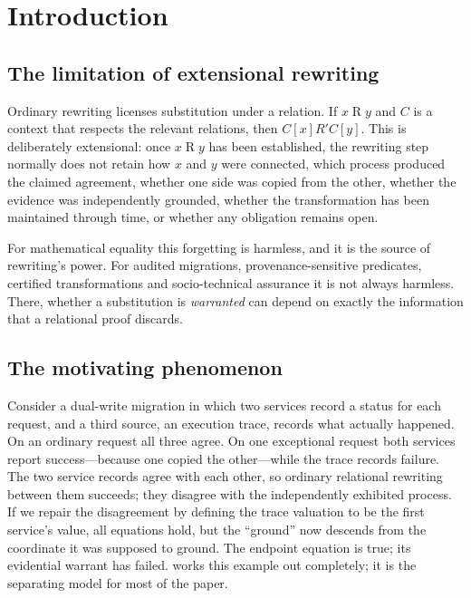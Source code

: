 \section{Introduction}\label{sec:intro}

\subsection{The limitation of extensional rewriting}
Ordinary rewriting licenses substitution under a relation. If $x \mathrel{R} y$ and $C$ is a context that respects the relevant relations, then $C[x] \mathrel{R'} C[y]$. This is deliberately extensional: once $x \mathrel{R} y$ has been established, the rewriting step normally does not retain how $x$ and $y$ were connected, which process produced the claimed agreement, whether one side was copied from the other, whether the evidence was independently grounded, whether the transformation has been maintained through time, or whether any obligation remains open.

For mathematical equality this forgetting is harmless, and it is the source of rewriting's power. For audited migrations, provenance-sensitive predicates, certified transformations and socio-technical assurance it is not always harmless. There, whether a substitution is \emph{warranted} can depend on exactly the information that a relational proof discards.

\subsection{The motivating phenomenon}
Consider a dual-write migration in which two services record a status for each request, and a third source, an execution trace, records what actually happened. On an ordinary request all three agree. On one exceptional request both services report success---because one copied the other---while the trace records failure. The two service records agree with each other, so ordinary relational rewriting between them succeeds; they disagree with the independently exhibited process. If we repair the disagreement by defining the trace valuation to be the first service's value, all equations hold, but the ``ground'' now descends from the coordinate it was supposed to ground. The endpoint equation is true; its evidential warrant has failed.
 works this example out completely; it is the separating model for most of the paper.


